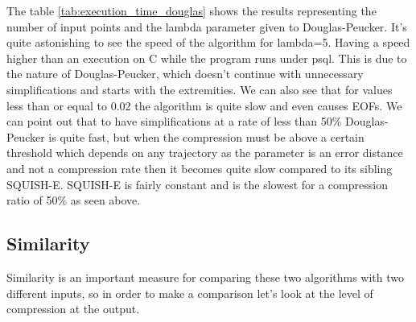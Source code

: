 The table \ref{tab:execution_time_douglas} shows the results representing the number of input points and the lambda parameter given to Douglas-Peucker.
It's quite astonishing to see the speed of the algorithm for lambda=5. Having a speed higher than an execution on C while the program runs under psql.  This is due to the nature of Douglas-Peucker, which doesn't continue with unnecessary simplifications and starts with the extremities. We can also see that for values less than or equal to 0.02 the algorithm is quite slow and even causes EOFs. We can point out that to have simplifications at a rate of less than 50\% Douglas-Peucker is quite fast, but when the compression must be above a certain threshold which depends on any trajectory as the parameter is an error distance and not a compression rate then it becomes quite slow compared to its sibling SQUISH-E.  SQUISH-E is fairly constant and is the slowest for a compression ratio of 50\% as seen above.

\subsection{Similarity}
Similarity is an important measure for comparing these two algorithms with two different inputs, so in order to make a comparison let's look at the level of compression at the output. 


